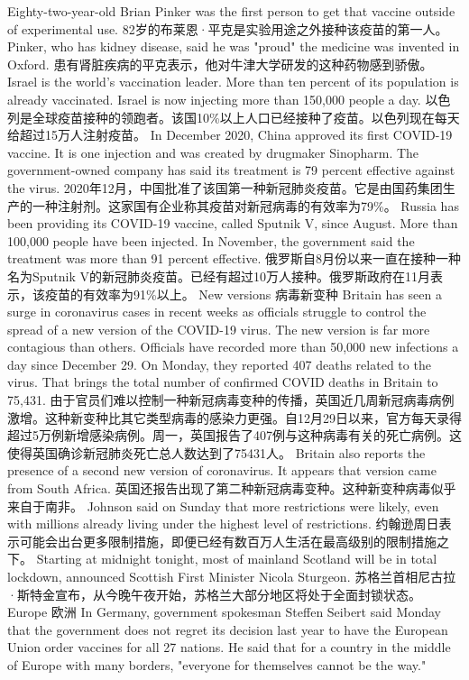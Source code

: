 Eighty-two-year-old Brian Pinker was the first person to get that vaccine outside of experimental use.
82岁的布莱恩·平克是实验用途之外接种该疫苗的第一人。
Pinker, who has kidney disease, said he was "proud" the medicine was invented in Oxford.
患有肾脏疾病的平克表示，他对牛津大学研发的这种药物感到骄傲。
Israel is the world's vaccination leader. More than ten percent of its population is already vaccinated. Israel is now injecting more than 150,000 people a day.
以色列是全球疫苗接种的领跑者。该国10\%以上人口已经接种了疫苗。以色列现在每天给超过15万人注射疫苗。
In December 2020, China approved its first COVID-19 vaccine. It is one injection and was created by drugmaker Sinopharm. The government-owned company has said its treatment is 79 percent effective against the virus.
2020年12月，中国批准了该国第一种新冠肺炎疫苗。它是由国药集团生产的一种注射剂。这家国有企业称其疫苗对新冠病毒的有效率为79\%。
Russia has been providing its COVID-19 vaccine, called Sputnik V, since August. More than 100,000 people have been injected. In November, the government said the treatment was more than 91 percent effective.
俄罗斯自8月份以来一直在接种一种名为Sputnik V的新冠肺炎疫苗。已经有超过10万人接种。俄罗斯政府在11月表示，该疫苗的有效率为91\%以上。
New versions
病毒新变种
Britain has seen a surge in coronavirus cases in recent weeks as officials struggle to control the spread of a new version of the COVID-19 virus. The new version is far more contagious than others. Officials have recorded more than 50,000 new infections a day since December 29. On Monday, they reported 407 deaths related to the virus. That brings the total number of confirmed COVID deaths in Britain to 75,431.
由于官员们难以控制一种新冠病毒变种的传播，英国近几周新冠病毒病例激增。这种新变种比其它类型病毒的感染力更强。自12月29日以来，官方每天录得超过5万例新增感染病例。周一，英国报告了407例与这种病毒有关的死亡病例。这使得英国确诊新冠肺炎死亡总人数达到了75431人。
Britain also reports the presence of a second new version of coronavirus. It appears that version came from South Africa.
英国还报告出现了第二种新冠病毒变种。这种新变种病毒似乎来自于南非。
Johnson said on Sunday that more restrictions were likely, even with millions already living under the highest level of restrictions.
约翰逊周日表示可能会出台更多限制措施，即便已经有数百万人生活在最高级别的限制措施之下。
Starting at midnight tonight, most of mainland Scotland will be in total lockdown, announced Scottish First Minister Nicola Sturgeon.
苏格兰首相尼古拉·斯特金宣布，从今晚午夜开始，苏格兰大部分地区将处于全面封锁状态。
Europe
欧洲
In Germany, government spokesman Steffen Seibert said Monday that the government does not regret its decision last year to have the European Union order vaccines for all 27 nations. He said that for a country in the middle of Europe with many borders, "everyone for themselves cannot be the way."
